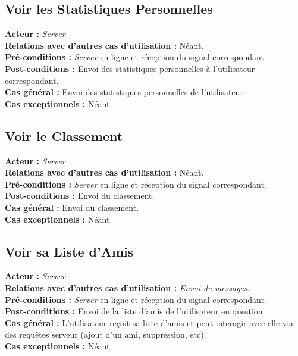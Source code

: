 \documentclass[10pt, a4paper]{article}
\begin{document}
\subsection{Voir les Statistiques Personnelles}
\textbf{Acteur :} \textit{Server} \\
\textbf{Relations avec d'autres cas d'utilisation :} Néant. \\
\textbf{Pré-conditions :} \textit{Server} en ligne et réception du signal correspondant. \\
\textbf{Post-conditions :} Envoi des statistiques personnelles à l'utilisateur correspondant. \\
\textbf{Cas général :} Envoi des statistiques personnelles de l'utilisateur. \\
\textbf{Cas exceptionnels :} Néant. \\

\subsection{Voir le Classement}
\textbf{Acteur :} \textit{Server} \\
\textbf{Relations avec d'autres cas d'utilisation :} Néant. \\
\textbf{Pré-conditions :} \textit{Server} en ligne et réception du signal correspondant. \\
\textbf{Post-conditions :} Envoi du classement. \\
\textbf{Cas général :} Envoi du classement. \\
\textbf{Cas exceptionnels :} Néant. \\

\subsection{Voir sa Liste d'Amis}
\textbf{Acteur :} \textit{Server} \\
\textbf{Relations avec d'autres cas d'utilisation :} {\itshape Envoi de messages}. \\
\textbf{Pré-conditions :} \textit{Server} en ligne et réception du signal correspondant. \\
\textbf{Post-conditions :} Envoi de la liste d'amis de l'utilisateur en question. \\
\textbf{Cas général :} L'utilisateur reçoit sa liste d'amis et peut interagir avec elle via des requêtes serveur (ajout d'un ami, suppression, etc).\\
\textbf{Cas exceptionnels :} Néant. \\
\end{document}
